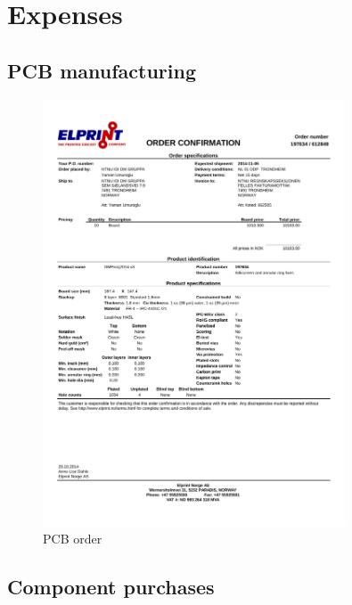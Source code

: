 \documentclass[../main/report.tex]{subfiles}
\begin{document}
\chapter{Expenses}

\newpage

\section{PCB manufacturing}

\begin{figure}[H]
    \centering
    \includegraphics[width=0.8\textwidth]{../appendix/assets/pcb-purchase.pdf}
    \caption{PCB order}
    \label{fig:pcb-order}
\end{figure}


\section{Component purchases}
\end{document}

